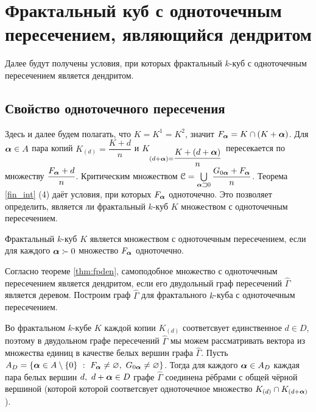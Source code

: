 \section{Фрактальный куб с одноточечным пересечением, являющийся дендритом}

Далее будут получены условия, при которых фрактальный $k$-куб с одноточечным пересечением является дендритом.

\subsection{Свойство одноточечного пересечения}

Здесь и далее будем полагать, что $K=K^1=K^2$, значит $F_{\bm{\alpha}}=K\cap(K+{\bm{\alpha}})$.
Для ${\bm{\alpha}}\in A$ пара копий $K_{(d)}=\dfrac{K+d}{n}$ и $K_{(d+{\bm{\alpha}})=\dfrac{K+(d+{\bm{\alpha}})}{n}}$ пересекается по множеству $\dfrac{F_{\bm{\alpha}}+d}{n}$.
Критическим множеством ${\EuScript C}=\bigcup\limits_{{\bm{\alpha}}\sqsupset0}\dfrac{G_{0{\bm{\alpha}}}+F_{\bm{\alpha}}}{n}$.
Теорема \ref{fin_int} (4) даёт условия, при которых $F_{\bm{\alpha}}$ одноточечно.
Это позволяет определить, является ли фрактальный $k$-куб $K$ множеством с одноточечным пересечением. 

\begin{corollary}\label{SIPQ}
Фрактальный $k$-куб $K$ является множеством с одноточечным пересечением, если для каждого ${\bm{\alpha}}\succ0$ множество $F_{\bm{\alpha}}$ одноточечно.
\end{corollary}


Согласно теореме \ref{thm:fpden}, самоподобное множество с одноточечным пересечением является дендритом, если его двудольный граф пересечений $\hat\Gamma$ является деревом.
Построим граф $\hat\Gamma$ для фрактального $k$-куба с одноточечным пересечением.

Во фрактальном $k$-кубе $K$ каждой копии $K_{(d)}$ соответсвует единственное $d\in D$, поэтому в двудольном графе пересечений $\hat\Gamma$ мы можем рассматривать вектора из множества единиц в качестве белых вершин графа $\hat\Gamma$.
Пусть $A_D=\{\bma\in A\mmm\{0\}\ :\ F_\bma\neq\0,\ G_{0\bma}\neq\0\}$.
Тогда для каждого ${\bm{\alpha}}\in A_D$ каждая пара белых вершин $d,\ d+{\bm{\alpha}}\in D$ графе $\hat\Gamma$ соединена рёбрами с общей чёрной вершиной (которой которой соответсвует одноточечное множество $K_{(d)}\cap K_{(d+{\bm{\alpha}})}$).

